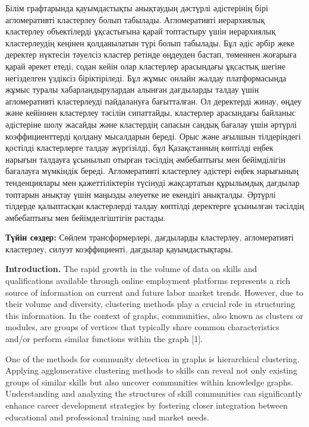 Білім графтарында қауымдастықты анықтаудың дәстүрлі әдістерінің бірі
агломеративті кластерлеу болып табылады. Агломеративті иерархиялық
кластерлеу объектілерді ұқсастығына қарай топтастыру үшін иерархиялық
кластерлеудің кеңінен қолданылатын түрі болып табылады. Бұл әдіс әрбір
жеке деректер нүктесін тәуелсіз кластер ретінде өңдеуден бастап,
төменнен жоғарыға қарай әрекет етеді, содан кейін олар кластерлер
арасындағы ұқсастық шегіне негізделген үздіксіз біріктіріледі. Бұл жұмыс
онлайн жалдау платформасында жұмыс туралы хабарландырулардан алынған
дағдыларды талдау үшін агломеративті кластерлеуді пайдалануға
бағытталған. Ол деректерді жинау, өңдеу және кейіннен кластерлеу тәсілін
сипаттайды, кластерлер арасындағы байланыс әдістеріне шолу жасайды және
кластердің сапасын сандық бағалау үшін әртүрлі коэффициенттерді қолдану
мысалдарын береді. Орыс және ағылшын тілдеріндегі қостілді кластерлерге
талдау жүргізілді, бұл Қазақстанның көптілді еңбек нарығын талдауға
ұсынылып отырған тәсілдің әмбебаптығы мен бейімділігін бағалауға
мүмкіндік береді. Агломеративті кластерлеу әдістері еңбек нарығының
тенденциялары мен қажеттіліктерін түсінуді жақсартатын құрылымдық
дағдылар топтарын анықтау үшін маңызды әлеуетке ие екендігі анықталды.
Әртүрлі тілдерде қалыптасқан кластерлерді талдау көптілді деректерге
ұсынылған тәсілдің әмбебаптығы мен бейімделгіштігін растады.

{\bfseries Түйін сөздер:} Сөйлем трансформерлері, дағдыларды кластерлеу,
агломеративті кластерлеу, силуэт коэффициенті, дағдылар қауымдастықтары.

{\bfseries Introduction.} The rapid growth in the volume of data on skills
and qualifications available through online employment platforms
represents a rich source of information on current and future labor
market trends. However, due to their volume and diversity, clustering
methods play a crucial role in structuring this information. In the
context of graphs, communities, also known as clusters or modules, are
groups of vertices that typically share common characteristics and/or
perform similar functions within the graph {[}1{]}.

One of the methods for community detection in graphs is hierarchical
clustering. Applying agglomerative clustering methods to skills can
reveal not only existing groups of similar skills but also uncover
communities within knowledge graphs. Understanding and analyzing the
structures of skill communities can significantly enhance career
development strategies by fostering closer integration between
educational and professional training and market needs.

